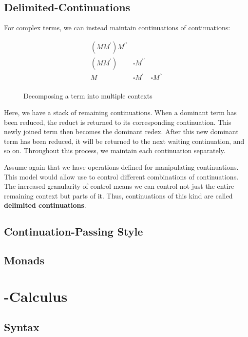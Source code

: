   \subsection{Delimited-Continuations}
 
  For complex terms, we can instead maintain continuations of continuations:
  
  \begin{figure}[!h]
    \[
    \begin{array}{lll}
      (MM^\prime) M^{\prime\prime} \\
      (MM^\prime) & \square M^{\prime\prime} \\
      M & \square M^\prime & \square M^{\prime\prime} \\
    \end{array}
    \]
  \caption{Decomposing a term into multiple contexts}
  \end{figure}

  Here, we have a stack of remaining continuations. When a dominant term
  has been reduced, the reduct is returned to its corresponding continuation. 
  This newly joined term then becomes the dominant redex. After this new 
  dominant term has been reduced, it will be returned to the next waiting 
  continuation, and so on. Throughout this process, we maintain each 
  continuation separately.
  
  Assume again that we have operations defined for manipulating continuations.
  This model would allow use to control different combinations of continuations.
  The increased granularity of control means we can control not just the
  entire remaining context but parts of it. Thus, continuations of this kind
  are called \textbf{delimited continuations}.

  
  \subsection{Continuation-Passing Style}
  \subsection{Monads}

\section{\lmu-Calculus}
  \subsection{Syntax}
  \begin{figure}[!h]
  \end{figure}
  
